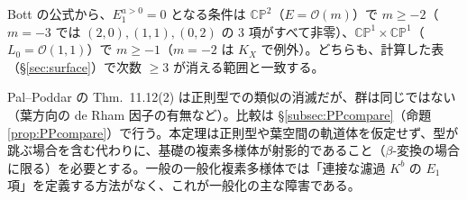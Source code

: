 \begin{rem}[有効な閾値\ \tV]
Bott の公式から、$E_1^{a>0}=0$ となる条件は $\mathbb{CP}^2$（$E=\mathcal O(m)$）で $m\ge-2$（$m=-3$ では $(2,0),(1,1),(0,2)$ の 3 項がすべて非零）、$\mathbb{CP}^1\times\mathbb{CP}^1$（$L_0=\mathcal O(1,1)$）で $m\ge-1$（$m=-2$ は $K_X$ で例外）。どちらも、計算した表（\S\ref{sec:surface}）で次数 $\ge3$ が消える範囲と一致する。
\end{rem}
\begin{rem}
Pal--Poddar \cite{PP} の Thm.~11.12(2) は正則型での類似の消滅だが、群は同じではない（葉方向の de Rham 因子の有無など）。比較は \S\ref{subsec:PPcompare}（命題 \ref{prop:PPcompare}）で行う。本定理は正則型や葉空間の軌道体を仮定せず、型が跳ぶ場合を含む代わりに、基礎の複素多様体が射影的であること（$\beta$-変換の場合に限る）を必要とする。一般の一般化複素多様体では「連接な濾過 $K^b$ の $E_1$ 項」を定義する方法がなく、これが一般化の主な障害である\tK。
\end{rem}


